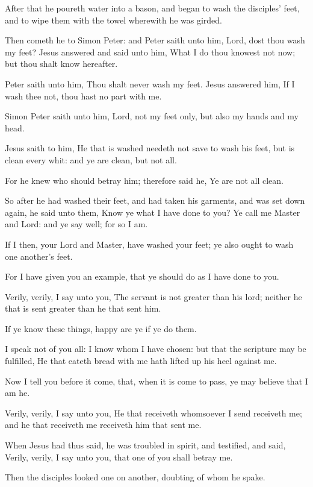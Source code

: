 \Verse After that he poureth water into a bason, and began to wash the disciples' feet, and to wipe them with the towel wherewith he was girded.

\Verse Then cometh he to Simon Peter: and Peter saith unto him, Lord, dost thou wash my feet?  \Verse Jesus answered and said unto him, What I do thou knowest not now; but thou shalt know hereafter.

\Verse Peter saith unto him, Thou shalt never wash my feet. Jesus answered him, If I wash thee not, thou hast no part with me.

\Verse Simon Peter saith unto him, Lord, not my feet only, but also my hands and my head.

\Verse Jesus saith to him, He that is washed needeth not save to wash his feet, but is clean every whit: and ye are clean, but not all.

\Verse For he knew who should betray him; therefore said he, Ye are not all clean.

\Verse So after he had washed their feet, and had taken his garments, and was set down again, he said unto them, Know ye what I have done to you?  \Verse Ye call me Master and Lord: and ye say well; for so I am.

\Verse If I then, your Lord and Master, have washed your feet; ye also ought to wash one another's feet.

\Verse For I have given you an example, that ye should do as I have done to you.

\Verse Verily, verily, I say unto you, The servant is not greater than his lord; neither he that is sent greater than he that sent him.

\Verse If ye know these things, happy are ye if ye do them.

\Verse I speak not of you all: I know whom I have chosen: but that the scripture may be fulfilled, He that eateth bread with me hath lifted up his heel against me.

\Verse Now I tell you before it come, that, when it is come to pass, ye may believe that I am he.

\Verse Verily, verily, I say unto you, He that receiveth whomsoever I send receiveth me; and he that receiveth me receiveth him that sent me.

\Verse When Jesus had thus said, he was troubled in spirit, and testified, and said, Verily, verily, I say unto you, that one of you shall betray me.

\Verse Then the disciples looked one on another, doubting of whom he spake.

